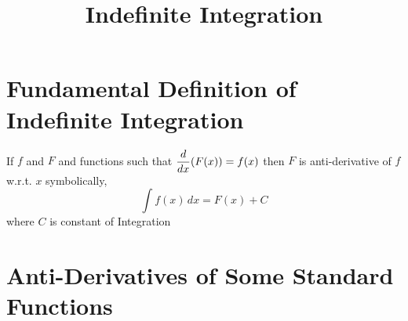 \documentclass{article}
\title{Indefinite Integration}
\author{}
\date{}
\begin{document}
\maketitle

\section{Fundamental Definition of \\ Indefinite Integration}
If $f$ and $F$ and functions such that $\displaystyle\dv{x}(F(x))=f(x)$ then $F$ is anti-derivative of $f$ w.r.t. $x$ symbolically, $$\displaystyle\int f(x) \,dx=F(x)+C$$
where $C$ is constant of Integration

\section{Anti-Derivatives of Some Standard Functions}
\end{document}
